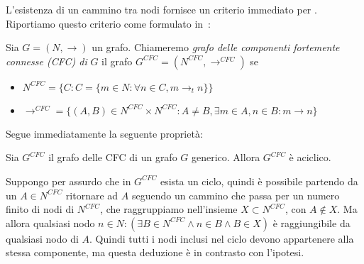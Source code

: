 L'esistenza di un cammino tra nodi fornisce un criterio immediato per . Riportiamo questo criterio come formulato in~\cite{gentilini}:
\begin{definition}
    Sia $G = (N, \to)$ un grafo. Chiameremo \textit{grafo delle componenti fortemente connesse (CFC) di} $G$ il grafo $G^{CFC} = (N^{CFC}, \to^{CFC})$ se
    \begin{itemize}
        \item $N^{CFC} = \{C : C = \{m \in N : \forall n \in C, m \to_t n\}\}$
        \item $\to^{CFC} = \{(A,B) \in N^{CFC} \times N^{CFC} : A \neq B, \exists m \in A, n \in B : m \to n\}$
    \end{itemize}
\end{definition}
Segue immediatamente la seguente proprietà:
\begin{proposition}
    Sia $G^{CFC}$ il grafo delle CFC di un grafo $G$ generico. Allora $G^{CFC}$ è aciclico.
\end{proposition}
\begin{proof2}
    Suppongo per assurdo che in $G^{CFC}$ esista un ciclo, quindi è possibile partendo da un $A \in N^{CFC}$ ritornare ad $A$ seguendo un cammino che passa per un numero
    finito di nodi di $N^{CFC}$, che raggruppiamo nell'insieme $X \subset N^{CFC}$, con $A \not\in X$. Ma allora qualsiasi nodo
    $n \in N : (\exists B \in N^{CFC} \land n \in B \land B \in X)$ è raggiungibile da qualsiasi nodo di $A$. Quindi tutti i nodi inclusi nel ciclo devono appartenere alla
    stessa componente, ma questa deduzione è in contrasto con l'ipotesi.
\end{proof2}
